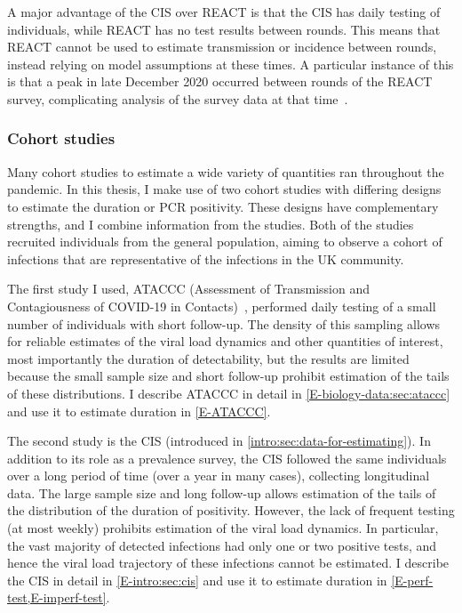 \documentclass[thesis.tex]{subfiles}
\begin{document}
A major advantage of the CIS over REACT is that the CIS has daily testing of individuals, while REACT has no test results between rounds.
This means that REACT cannot be used to estimate transmission or incidence between rounds, instead relying on model assumptions at these times.
A particular instance of this is that a peak in late December 2020 occurred between rounds of the REACT survey, complicating analysis of the survey data at that time~\autocite{rileyREACTround8}.

\subsubsection{Cohort studies}

Many cohort studies to estimate a wide variety of quantities ran throughout the pandemic.
In this thesis, I make use of two cohort studies with differing designs to estimate the duration or PCR positivity.
These designs have complementary strengths, and I combine information from the studies.
Both of the studies recruited individuals from the general population, aiming to observe a cohort of infections that are representative of the infections in the UK community.

The first study I used, ATACCC (Assessment of Transmission and Contagiousness of COVID-19 in Contacts)~\autocite{singanayagamCommunity,hakkiOnset}, performed daily testing of a small number of individuals with short follow-up.
The density of this sampling allows for reliable estimates of the viral load dynamics and other quantities of interest, most importantly the duration of detectability, but the results are limited because the small sample size and short follow-up prohibit estimation of the tails of these distributions.
I describe ATACCC in detail in \cref{E-biology-data:sec:ataccc} and use it to estimate duration in \cref{E-ATACCC}.

The second study is the CIS (introduced in \cref{intro:sec:data-for-estimating}).
In addition to its role as a prevalence survey, the CIS followed the same individuals over a long period of time (over a year in many cases), collecting longitudinal data.
The large sample size and long follow-up allows estimation of the tails of the distribution of the duration of positivity.
However, the lack of frequent testing (at most weekly) prohibits estimation of the viral load dynamics.
In particular, the vast majority of detected infections had only one or two positive tests, and hence the viral load trajectory of these infections cannot be estimated.
I describe the CIS in detail in \cref{E-intro:sec:cis} and use it to estimate duration in \cref{E-perf-test,E-imperf-test}.
\end{document}

